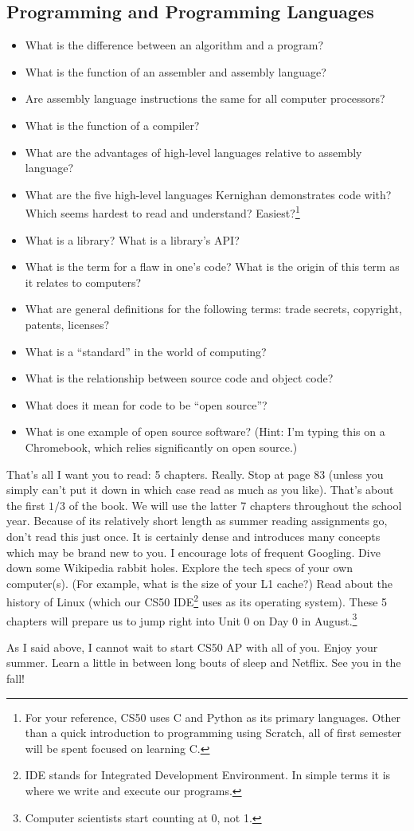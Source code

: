\documentclass[12pt]{article}
\begin{document}
\subsection*{Programming and Programming Languages}
\begin{itemize}
	\item What is the difference between an algorithm and a program?
	\item What is the function of an assembler and assembly language?
	\item Are assembly language instructions the same for all computer processors?
	\item What is the function of a compiler?
	\item What are the advantages of high-level languages relative to assembly language?
	\item What are the five high-level languages Kernighan demonstrates code with? Which seems hardest to read and understand? Easiest?\footnote{For your reference, CS50 uses C and Python as its primary languages. Other than a quick introduction to programming using Scratch, all of first semester will be spent focused on learning C.}
	\item What is a library? What is a library's API?
	\item What is the term for a flaw in one's code? What is the origin of this term as it relates to computers?
	\item What are general definitions for the following terms: trade secrets, copyright, patents, licenses?
	\item What is a ``standard'' in the world of computing?
	\item What is the relationship between source code and object code?
	\item What does it mean for code to be ``open source''?
	\item What is one example of open source software? (Hint: I'm typing this on a Chromebook, which relies significantly on open source.)
\end{itemize}

That's all I want you to read: 5 chapters. Really. Stop at page 83 (unless you simply can't put it down in which case read as much as you like). That's about the first $1/3$ of the book. We will use the latter 7 chapters throughout the school year. Because of its relatively short length as summer reading assignments go, don't read this just once. It is certainly dense and introduces many concepts which may be brand new to you. I encourage lots of frequent Googling. Dive down some Wikipedia rabbit holes. Explore the tech specs of your own computer(s). (For example, what is the size of your L1 cache?) Read about the history of Linux (which our CS50 IDE\footnote{IDE stands for Integrated Development Environment. In simple terms it is where we write and execute our programs.} uses as its operating system). These 5 chapters will prepare us to jump right into Unit 0 on Day 0 in August.\footnote{Computer scientists start counting at 0, not 1.}

As I said above, I cannot wait to start CS50 AP with all of you. Enjoy your summer. Learn a little in between long bouts of sleep and Netflix. See you in the fall!
\end{document}
